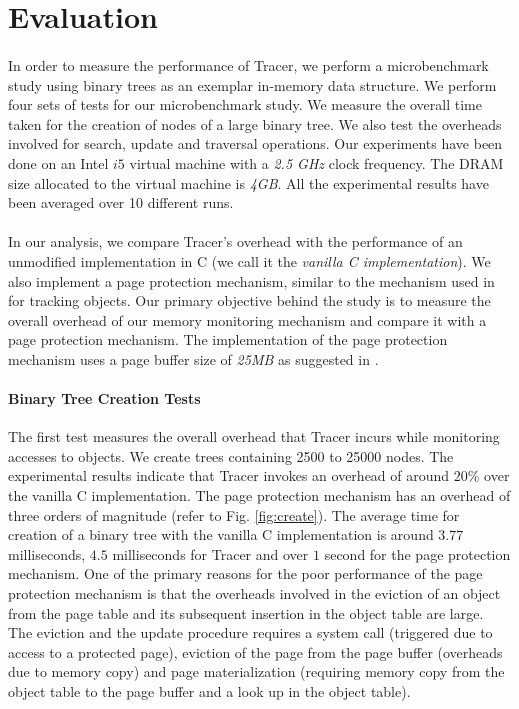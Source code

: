 \section{Evaluation}
\label{sec:eval}

\paragraph{}
In order to measure the performance of Tracer, we perform a microbenchmark study using binary trees as an exemplar in-memory data structure. We perform four sets of tests for our microbenchmark study. We measure the overall time taken for the creation of nodes of a large binary tree. We also test the overheads involved for search, update and traversal operations. Our experiments have been done on an Intel $i5$ virtual machine with a {\emph{2.5 GHz}} clock frequency. The DRAM size allocated to the virtual machine is {\emph{4GB}}. All the experimental results have been averaged over 10 different runs. 

\paragraph{}
In our analysis, we compare Tracer's overhead with the performance of an unmodified implementation in C (we call it the {\emph{vanilla C implementation}}). We also implement a page protection mechanism, similar to the mechanism used in \cite{SSDAlloc} for tracking objects. Our primary objective behind the study is to measure the overall overhead of our memory monitoring mechanism and compare it with a page protection mechanism. The implementation of the page protection mechanism uses a page buffer size of {\emph{25MB}} as suggested in \cite{SSDAlloc}.


\paragraph{Binary Tree Creation Tests}
The first test measures the overall overhead that Tracer incurs while monitoring accesses to objects. We create trees containing 2500 to 25000 nodes. The experimental results indicate that Tracer invokes an overhead of around $20\%$ over the vanilla C implementation. The page protection mechanism has an overhead of three orders of magnitude (refer to Fig. \ref{fig:create}). The average time for creation of a binary tree with the vanilla C implementation is around $3.77$ milliseconds, $4.5$ milliseconds for Tracer and over $1$ second for the page protection mechanism. One of the primary reasons for the poor performance of the page protection mechanism is that the overheads involved in the eviction of an object from the page table and its subsequent insertion in the object table are large. The eviction and the update procedure requires a system call (triggered due to access to a protected page), eviction of the page from the page buffer (overheads due to memory copy) and page materialization (requiring memory copy from the object table to the page buffer and a look up in the object table). 


